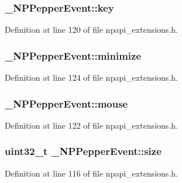 \hypertarget{struct___n_p_pepper_event_a2892f0885f8c7e8bed5500472fb16b88}{
\subsubsection[{key}]{ {\bf \_\-NPPepperEvent::key}}}
\label{struct___n_p_pepper_event_a2892f0885f8c7e8bed5500472fb16b88}


Definition at line 120 of file npapi\_\-extensions.h.

\hypertarget{struct___n_p_pepper_event_aaf163b2d91536ab2c5a5b06040a3afb9}{
\subsubsection[{minimize}]{ {\bf \_\-NPPepperEvent::minimize}}}
\label{struct___n_p_pepper_event_aaf163b2d91536ab2c5a5b06040a3afb9}


Definition at line 124 of file npapi\_\-extensions.h.

\hypertarget{struct___n_p_pepper_event_aadfc1a87c80619b59daddc56bafe0574}{
\subsubsection[{mouse}]{ {\bf \_\-NPPepperEvent::mouse}}}
\label{struct___n_p_pepper_event_aadfc1a87c80619b59daddc56bafe0574}


Definition at line 122 of file npapi\_\-extensions.h.

\hypertarget{struct___n_p_pepper_event_aa6436fed961910c5be5893569334f937}{
\subsubsection[{size}]{\setlength{\rightskip}{0pt plus 5cm}uint32\_\-t {\bf \_\-NPPepperEvent::size}}}
\label{struct___n_p_pepper_event_aa6436fed961910c5be5893569334f937}


Definition at line 116 of file npapi\_\-extensions.h.

